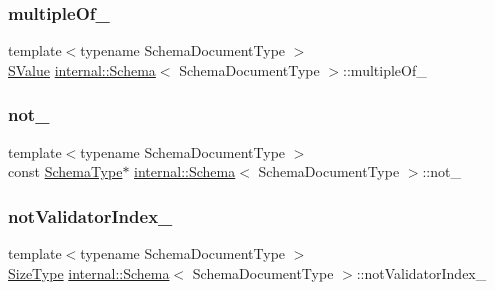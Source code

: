 \mbox{\label{classinternal_1_1Schema_af016f3427aaec08d588229bd83a56339}} 
\subsubsection{\texorpdfstring{multiple\+Of\+\_\+}{multipleOf\_}}
{\footnotesize\ttfamily template$<$typename Schema\+Document\+Type $>$ \\
\hyperlink{classinternal_1_1Schema_ab3a07540a27d4cc2b0e260290c5c5771}{S\+Value} \hyperlink{classinternal_1_1Schema}{internal\+::\+Schema}$<$ Schema\+Document\+Type $>$\+::multiple\+Of\+\_\+\hspace{0.3cm}{\ttfamily [private]}}

\mbox{\label{classinternal_1_1Schema_ab40b8c0a5712328b606d2e64102a1ed6}} 
\subsubsection{\texorpdfstring{not\+\_\+}{not\_}}
{\footnotesize\ttfamily template$<$typename Schema\+Document\+Type $>$ \\
const \hyperlink{classinternal_1_1Schema_ac2556ebf7a7db971e1c1c0f76eb5786e}{Schema\+Type}$\ast$ \hyperlink{classinternal_1_1Schema}{internal\+::\+Schema}$<$ Schema\+Document\+Type $>$\+::not\+\_\+\hspace{0.3cm}{\ttfamily [private]}}

\mbox{\label{classinternal_1_1Schema_a07e918a892902e0280312f33aa5d539e}} 
\subsubsection{\texorpdfstring{not\+Validator\+Index\+\_\+}{notValidatorIndex\_}}
{\footnotesize\ttfamily template$<$typename Schema\+Document\+Type $>$ \\
\hyperlink{rapidjson_8h_a5ed6e6e67250fadbd041127e6386dcb5}{Size\+Type} \hyperlink{classinternal_1_1Schema}{internal\+::\+Schema}$<$ Schema\+Document\+Type $>$\+::not\+Validator\+Index\+\_\+\hspace{0.3cm}{\ttfamily [private]}}

